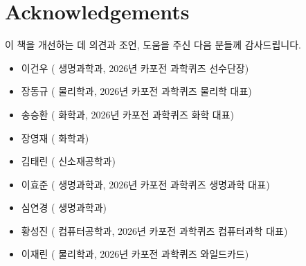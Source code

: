 \chapter*{Acknowledgements}
이 책을 개선하는 데 의견과 조언, 도움을 주신 다음 분들께 감사드립니다.
\begin{itemize}[leftmargin=1.55em,itemsep=0.42em,topsep=0.55em]
\item 이건우 (\POSTECHFullKR{} 생명과학과, 2026년 카포전 과학퀴즈 선수단장)
\item 장동규 (\POSTECHFullKR{} 물리학과, 2026년 카포전 과학퀴즈 물리학 대표)
\item 송승환 (\POSTECHFullKR{} 화학과, 2026년 카포전 과학퀴즈 화학 대표)
\item 장영재 (\POSTECHFullKR{} 화학과)
\item 김태린 (\POSTECHFullKR{} 신소재공학과)
\item 이효준 (\POSTECHFullKR{} 생명과학과, 2026년 카포전 과학퀴즈 생명과학 대표)
\item 심연경 (\POSTECHFullKR{} 생명과학과)
\item 황성진 (\POSTECHFullKR{} 컴퓨터공학과, 2026년 카포전 과학퀴즈 컴퓨터과학 대표)
\item 이재린 (\POSTECHFullKR{} 물리학과, 2026년 카포전 과학퀴즈 와일드카드)
\end{itemize}

